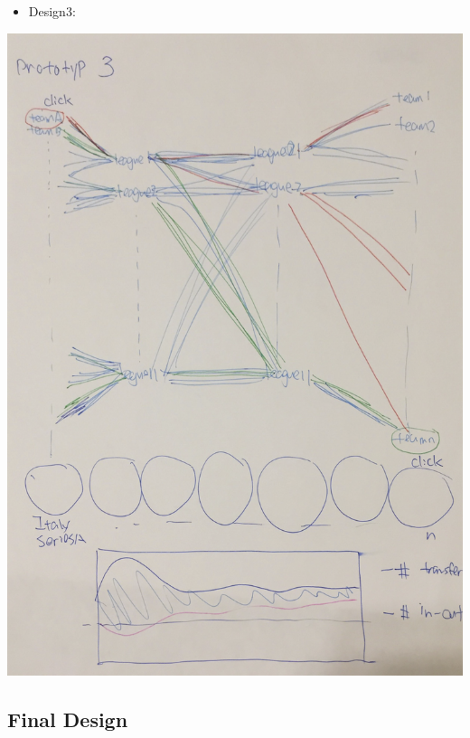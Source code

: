 \documentclass[11pt]{article}
\begin{document}
\begin{itemize}
\item Design3:
\end{itemize}
\includegraphics[width=.9\linewidth]{Design6.png}

\subsection{Final Design}
\label{sec-4-3}
\end{document}
